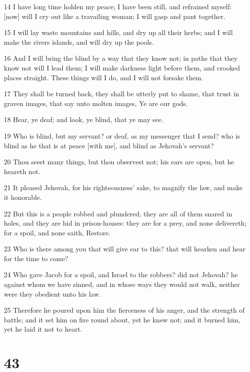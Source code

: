 \par 14 I have long time holden my peace; I have been still, and refrained myself: [now] will I cry out like a travailing woman; I will gasp and pant together.
\par 15 I will lay waste mountains and hills, and dry up all their herbs; and I will make the rivers islands, and will dry up the pools.
\par 16 And I will bring the blind by a way that they know not; in paths that they know not will I lead them; I will make darkness light before them, and crooked places straight. These things will I do, and I will not forsake them.
\par 17 They shall be turned back, they shall be utterly put to shame, that trust in graven images, that say unto molten images, Ye are our gods.
\par 18 Hear, ye deaf; and look, ye blind, that ye may see.
\par 19 Who is blind, but my servant? or deaf, as my messenger that I send? who is blind as he that is at peace [with me], and blind as Jehovah's servant?
\par 20 Thou seest many things, but thou observest not; his ears are open, but he heareth not.
\par 21 It pleased Jehovah, for his righteousness' sake, to magnify the law, and make it honorable.
\par 22 But this is a people robbed and plundered; they are all of them snared in holes, and they are hid in prison-houses: they are for a prey, and none delivereth; for a spoil, and none saith, Restore.
\par 23 Who is there among you that will give ear to this? that will hearken and hear for the time to come?
\par 24 Who gave Jacob for a spoil, and Israel to the robbers? did not Jehovah? he against whom we have sinned, and in whose ways they would not walk, neither were they obedient unto his law.
\par 25 Therefore he poured upon him the fierceness of his anger, and the strength of battle; and it set him on fire round about, yet he knew not; and it burned him, yet he laid it not to heart.

\chapter{43}

